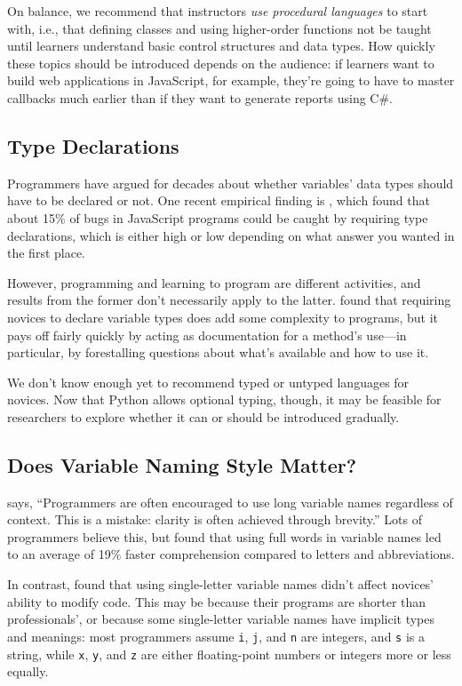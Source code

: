 On balance, we recommend that instructors \emph{use procedural languages} to
start with, i.e., that defining classes and using higher-order functions
not be taught until learners understand basic control structures and
data types. How quickly these topics should be introduced depends on the
audience: if learners want to build web applications in JavaScript, for
example, they're going to have to master callbacks much earlier than if
they want to generate reports using C\#.

\subsection*{Type Declarations}

Programmers have argued for decades about whether variables' data types
should have to be declared or not. One recent empirical finding is
\cite{Gao2017}, which found that about 15\% of bugs in JavaScript
programs could be caught by requiring type declarations, which is either
high or low depending on what answer you wanted in the first place.

However, programming and learning to program are different activities,
and results from the former don't necessarily apply to the latter.
\cite{Endr2014} found that requiring novices to declare variable
types does add some complexity to programs, but it pays off fairly
quickly by acting as documentation for a method's use---in particular, by
forestalling questions about what's available and how to use it.

We don't know enough yet to recommend typed or untyped languages for
novices. Now that Python allows optional typing, though, it may be
feasible for researchers to explore whether it can or should be
introduced gradually.

\subsection*{Does Variable Naming Style Matter?}

\cite{Kern1999} says, ``Programmers are often encouraged to use long
variable names regardless of context. This is a mistake: clarity is
often achieved through brevity.'' Lots of programmers believe this, but
\cite{Hofm2017} found that using full words in variable names led to
an average of 19\% faster comprehension compared to letters and
abbreviations.

In contrast, \cite{Beni2017} found that using single-letter variable
names didn't affect novices' ability to modify code. This may be because
their programs are shorter than professionals', or because some
single-letter variable names have implicit types and meanings: most
programmers assume \texttt{i}, \texttt{j}, and \texttt{n} are integers, and \texttt{s} is a string,
while \texttt{x}, \texttt{y}, and \texttt{z} are either floating-point numbers or integers
more or less equally.

